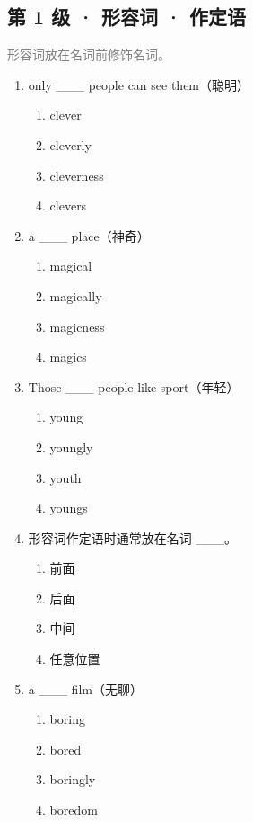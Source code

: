 \documentclass[11pt,a4paper]{ctexart}
\begin{document}
\subsection*{第 1 级 · 形容词 · 作定语}
\noindent\textcolor{gray}{形容词放在名词前修饰名词。}\par\smallskip
\begin{enumerate}[leftmargin=*,itemsep=4pt]
\item only \_\_\_ people can see them（聪明）
\begin{enumerate}[label=\Alph*.,leftmargin=2em,itemsep=1pt,topsep=2pt]
\item clever
\item cleverly
\item cleverness
\item clevers
\end{enumerate}
\item a \_\_\_ place（神奇）
\begin{enumerate}[label=\Alph*.,leftmargin=2em,itemsep=1pt,topsep=2pt]
\item magical
\item magically
\item magicness
\item magics
\end{enumerate}
\item Those \_\_\_ people like sport（年轻）
\begin{enumerate}[label=\Alph*.,leftmargin=2em,itemsep=1pt,topsep=2pt]
\item young
\item youngly
\item youth
\item youngs
\end{enumerate}
\item 形容词作定语时通常放在名词 \_\_\_。
\begin{enumerate}[label=\Alph*.,leftmargin=2em,itemsep=1pt,topsep=2pt]
\item 前面
\item 后面
\item 中间
\item 任意位置
\end{enumerate}
\item a \_\_\_ film（无聊）
\begin{enumerate}[label=\Alph*.,leftmargin=2em,itemsep=1pt,topsep=2pt]
\item boring
\item bored
\item boringly
\item boredom

\end{enumerate}
\end{enumerate}
\end{document}
